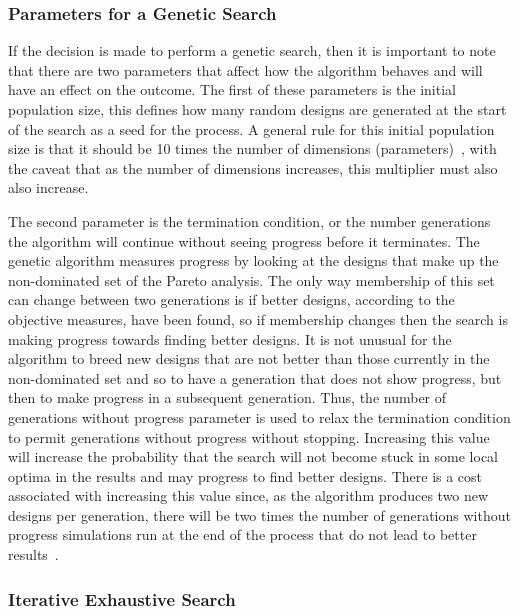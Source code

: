 \subsubsection{Parameters for a Genetic Search}

If the decision is made to perform a genetic search, then it is important to note that there are two parameters that affect how the algorithm behaves and will have an effect on the outcome.  The first of these parameters is the initial population size, this defines how many random designs are generated at the start of the search as a seed for the process.  A general rule for this initial population size is that it should be 10 times the number of dimensions (parameters)~\cite{diaz07initial}, with the caveat that as the number of dimensions increases, this multiplier must also also increase.  

The second parameter is the termination condition, or the number generations the algorithm will continue without seeing progress before it terminates.  The genetic algorithm measures progress by looking at the designs that make up the non-dominated set of the Pareto analysis.  The only way membership of this set can change between two generations is if better designs, according to the objective measures, have been found, so if membership changes then the search is making progress towards finding better designs.  It is not unusual for the algorithm to breed new designs that are not better than those currently in the non-dominated set and so to have a generation that does not show progress, but then to make progress in a subsequent generation.  Thus, the number of generations without progress parameter is used to relax the termination condition to permit generations without progress without stopping.  Increasing this value will increase the probability that the search will not become stuck in some local optima in the results and may progress to find better designs.  There is a cost associated with increasing this value since, as the algorithm produces two new designs per generation, there will be two times the number of generations without progress simulations run at the end of the process that do not lead to better results~\cite{Fitzgerald&17a}.




\subsubsection{Iterative Exhaustive Search}

